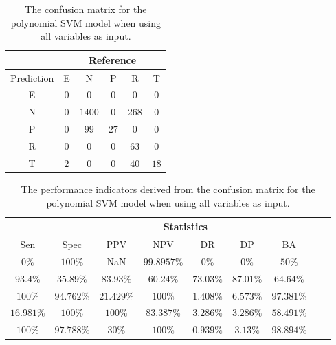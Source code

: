 \begin{table}[!ht]
	\centering
	\begin{tabular}{|c|c|c|c|c|c|}
		\hline
		 & \multicolumn{5}{|c|}{Reference} \\ \hline
		 Prediction & E & N & P & R & T \\ \hline
		 E & $0$ & $0$ & $0$ & $0$ & $0$ \\ \hline
		 N & $0$ & $1400$ & $0$ & $268$ & $0$ \\ \hline
		 P & $0$ & $99$ & $27$ & $0$ & $0$ \\ \hline
		 R & $0$ & $0$ & $0$ & $63$ & $0$ \\ \hline
		 T & $2$ & $0$ & $0$ & $40$ & $18$ \\ \hline
	\end{tabular}
	\caption{The confusion matrix for the polynomial SVM model when using all variables as input.}
	\label{tab:cm:all:svmPoly}
\end{table}

\begin{table}[!ht]
	\centering
	\begin{tabular}{|c|c|c|c|c|c|c|c|c|}
		\hline
		 & \multicolumn{7}{c|}{Statistics} \\ \hline
		Sen & Spec & PPV & NPV & DR & DP & BA \\ \hline
		$0\%$ & $100\%$ & NaN & $99.8957\%$ & $0\%$ & $0\%$ & $50\%$ \\ \hline
		$93.4\%$ & $35.89\%$ & $83.93\%$ & $60.24\%$ & $73.03\%$ & $87.01\%$ & $64.64\%$ \\ \hline
		$100\%$ & $94.762\%$ & $21.429\%$ & $100\%$ & $1.408\%$ & $6.573\%$ & $97.381\%$ \\ \hline
		$16.981\%$ & $100\%$ & $100\%$ & $83.387\%$ & $3.286\%$ & $3.286\%$ & $58.491\%$ \\ \hline
		$100\%$ & $97.788\%$ & $30\%$ & $100\%$ & $0.939\%$ & $3.13\%$ & $98.894\%$ \\ \hline
	\end{tabular}
	\caption{The performance indicators derived from the confusion matrix for the polynomial SVM model when using all variables as input.}
	\label{tab:cs:all:svmPoly}
\end{table}
